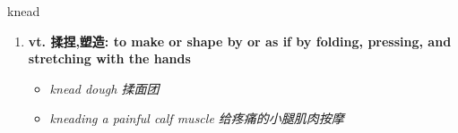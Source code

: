 
\begin{frame}
{\huge knead}
\begin{center}
\begin{enumerate}\Large
  \item \textbf{vt. 揉捏,塑造: to make or shape by or as if by folding, pressing, and stretching with the hands}
  \begin{itemize}
    \item \em{\Large{knead dough 揉面团}}
    \item \em{\Large{kneading a painful calf muscle 给疼痛的小腿肌肉按摩}}
  \end{itemize}
\end{enumerate}
\end{center}
\end{frame}
